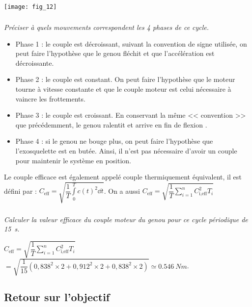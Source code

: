 \begin{multicols}{2}
\begin{center}
\texttt{[image: fig\_12]}
\end{center}


\subparagraph{} \textit{Préciser à quels mouvements correspondent les 4 phases de ce cycle.}

\ifprof
\begin{corrige}
\begin{itemize}
\item Phase 1 : le couple est décroissant, suivant la convention de signe utilisée, on peut faire l'hypothèse que le genou fléchit et que l’accélération est décroissante.
\item Phase 2 : le couple est constant. On peut faire l'hypothèse que le moteur tourne à vitesse constante et que le couple moteur est celui nécessaire à vaincre les frottements. 
\item Phase 3 : le couple est croissant. En conservant la même << convention >> que précédemment, le genou ralentit et arrive en fin de flexion .
\item Phase 4 : si le genou ne bouge plus, on peut faire l'hypothèse que l'exosquelette est en butée. Ainsi, il n'est pas nécessaire d'avoir un couple pour maintenir le système en position.
\end{itemize}
\end{corrige}
\else
\fi

Le couple efficace est également appelé couple thermiquement équivalent, il est défini par :
$C_{\text{eff}}=\sqrt{\dfrac{1}{T}\int\limits_0^Tc(t)^2 \dd t}$. On a aussi 
$C_{\text{eff}}=\sqrt{\dfrac{1}{T}\sum\limits_{i=1}^n C_{\text{i,eff}}^2 T_i }$


\fi

\subparagraph{} \textit{Calculer la valeur efficace du couple moteur du genou pour ce cycle périodique de \SI{15}{s}.}

\ifprof
\begin{corrige}
$C_{\text{eff}}=\sqrt{\dfrac{1}{T}\sum\limits_{i=1}^n C_{\text{i,eff}}^2 T_i }$
$=\sqrt{\dfrac{1}{15}\left(0,838^2 \times 2 +0,912^2 \times 2 + 0,838^2 \times 2 \right) }\simeq \SI{0,546}{Nm}$.
\end{corrige}
\else
\fi


\subsection*{Retour sur l'objectif}

\ifprof
\else


\end{multicols}
